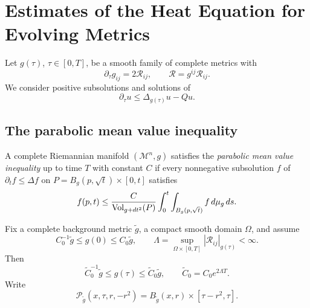 \chapter[25]{Estimates of the Heat Equation for Evolving Metrics}
\label{ch:chow-iii-estimates-heat-equation-evolving-metrics}

Let \(g(\tau)\), \(\tau\in[0,T]\), be a smooth family of complete metrics
with
\[
 \partial_\tau g_{ij}=2\mathcal R_{ij},\qquad
 \mathcal R=g^{ij}\mathcal R_{ij}.
\]
We consider positive subsolutions and solutions of
\[
 \partial_\tau u\leq \Delta_{g(\tau)}u-Qu.
\]

\section{The parabolic mean value inequality}

\begin{definition}
\label{def:chow-iii-parabolic-mean-value-inequality}

A complete Riemannian manifold \((\mathcal M^n,g)\) satisfies the
\emph{parabolic mean value inequality} up to time \(T\) with constant \(C\)
if every nonnegative subsolution \(f\) of \(\partial_t f\leq\Delta f\) on
\(P=B_g(p,\sqrt t)\times[0,t]\) satisfies
\[
 f(p,t)\leq \frac{C}{\operatorname{Vol}_{g+dt^2}(P)}
 \int_0^t\int_{B_g(p,\sqrt t)}f\,d\mu_g\,ds.
\]
\end{definition}

Fix a complete background metric \(\widetilde g\), a compact smooth domain
\(\Omega\), and assume
\[
 C_0^{-1}\widetilde g\leq g(0)\leq C_0\widetilde g,
 \qquad
 \Lambda=\sup_{\Omega\times[0,T]}|\mathcal R_{ij}|_{g(\tau)}<\infty.
\]
Then
\[
 \widetilde C_0^{-1}\widetilde g\leq g(\tau)
 \leq\widetilde C_0\widetilde g,
 \qquad \widetilde C_0=C_0e^{2\Lambda T}.
\]
Write
\[
 \mathcal P_{\widetilde g}(x,\tau,r,-r^2)
 =B_{\widetilde g}(x,r)\times[\tau-r^2,\tau].
\]

